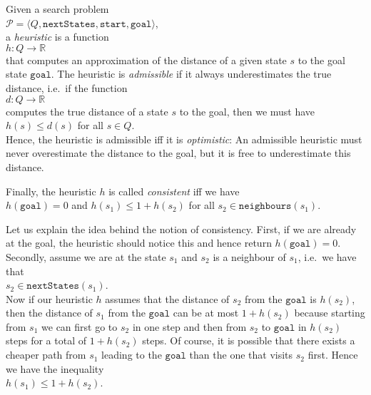 \begin{Definition}[Heuristic]
Given a search problem
\\[0.2cm]
\hspace*{1.3cm}
$\mathcal{P} = \langle Q, \mathtt{nextStates}, \mathtt{start}, \mathtt{goal} \rangle$,
\\[0.2cm]
a \emph{\color{blue}heuristic} is a function
\\[0.2cm]
\hspace*{1.3cm}
$h: Q \rightarrow \mathbb{R}$
\\[0.2cm]
that computes an approximation of the distance of a given state $s$ to the goal state $\mathtt{goal}$.
The heuristic is \emph{\color{blue}admissible} if it always underestimates the true distance, i.e.~if the function
\\[0.2cm]
\hspace*{1.3cm}
$d:Q \rightarrow \mathbb{R}$
\\[0.2cm]
computes the true distance of a state $s$ to the goal, then we must have
\\[0.2cm]
\hspace*{1.3cm}
$h(s) \leq d(s)$ \quad for all $s \in Q$.
\\[0.2cm]
Hence, the heuristic is admissible iff it is \emph{\color{blue}optimistic}:  An admissible heuristic must never overestimate the
distance to the goal, but it is free to underestimate this distance.

Finally, the  heuristic $h$ is called \emph{\color{blue}consistent} iff we have
\\[0.2cm]
\hspace*{1.3cm}
$h(\mathtt{goal}) = 0$ \quad and \quad $h(s_1) \leq 1 + h(s_2)$ \quad for all $s_2 \in \mathtt{neighbours}(s_1)$.  \eod
\end{Definition}

Let us explain the idea behind the notion of consistency.  First, if we are already at the goal, the heuristic
should notice this and hence return $h(\mathtt{goal}) = 0$.  Secondly, assume we are at the state $s_1$ and $s_2$ is a
neighbour of $s_1$, i.e.~we have that 
\\[0.2cm]
\hspace*{1.3cm}
$s_2 \in \mathtt{nextStates}(s_1)$.
\\[0.2cm]
Now if our heuristic $h$ assumes that the distance of $s_2$ from the $\mathtt{goal}$ is $h(s_2)$, then the distance of
$s_1$ from the $\mathtt{goal}$ can be at most $1 + h(s_2)$ because starting from $s_1$ we can first go to $s_2$
in one step and then from $s_2$ to $\mathtt{goal}$ in $h(s_2)$ steps for a total of $1 + h(s_2)$ steps.  Of
course, it is possible that there exists a cheaper path from $s_1$ leading to the $\mathtt{goal}$ than the one
that visits $s_2$ first.  Hence we have the inequality 
\\[0.2cm]
\hspace*{1.3cm}
$h(s_1) \leq 1 + h(s_2)$.

